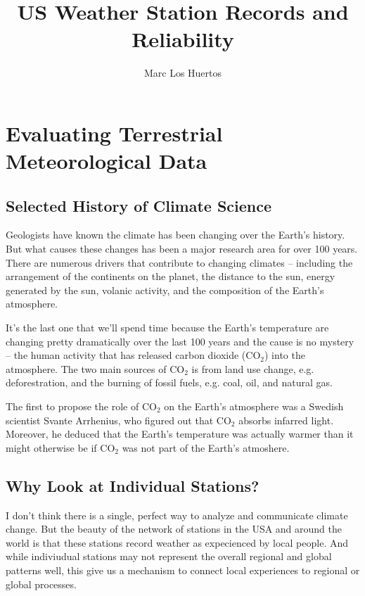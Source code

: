 \documentclass{article}
\title{US Weather Station Records and Reliability} %
\author{Marc Los Huertos}
\begin{document}
\maketitle

\tableofcontents

\section{Evaluating Terrestrial Meteorological Data}

\subsection{Selected History of Climate Science}

Geologists have known the climate has been changing over the Earth's history. But what causes these changes has been a major research area for over 100 years. There are numerous drivers that contribute to changing climates -- including the arrangement of the continents on the planet, the distance to the sun, energy generated by the sun, volanic activity, and the composition of the Earth's atmosphere. 

It's the last one that we'll spend time because the Earth's temperature are changing pretty dramatically over the last 100 years and the cause is no mystery -- the human activity that has released carbon dioxide (CO$_2$) into the atmosphere. The two main sources of CO$_2$ is from land use change, e.g. deforestration, and the burning of fossil fuels, e.g. coal, oil, and natural gas. 

The first to propose the role of CO$_2$ on the Earth's atmosphere was a Swedish scientist Svante Arrhenius, who figured out that CO$_2$ absorbs infarred light. Moreover, he deduced that the Earth's temperature was actually warmer than it might otherwise be if CO$_2$ was not part of the Earth's atmoshere. 

\subsection{Why Look at Individual Stations?}

I don't think there is a single, perfect way to analyze and communicate climate change. But the beauty of the network of stations in the USA and around the world is that these stations record weather as expecienced by local people. And while indiviudual stations may not represent the overall regional and global patterns well, this give us a mechanism to connect local experiences to regional or global processes. 
\end{document}
